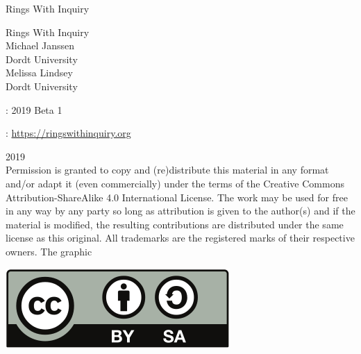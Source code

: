 \documentclass[oneside,10pt,]{book}
\numberwithin{equation}{section}
\begin{document}
\frontmatter
\thispagestyle{empty}
{\centering
\vspace*{0.28\textheight}
{\Huge Rings With Inquiry}\\}
\clearpage
\thispagestyle{empty}
\null%
\clearpage
\thispagestyle{empty}
{\centering
\vspace*{0.14\textheight}
{\Huge Rings With Inquiry}\\[3\baselineskip]
{\Large Michael Janssen}\\[0.5\baselineskip]
{\Large Dordt University}\\[3\baselineskip]
{\Large Melissa Lindsey}\\[0.5\baselineskip]
{\Large Dordt University}\\}
\clearpage
\thispagestyle{empty}
\hypertarget{g:colophon:idm269944732912}{}
: 2019 Beta 1\par\medskip
{}: \href{https:\slash{}\slash{}ringswithinquiry.org}{https:\slash{}\slash{}ringswithinquiry.org}\par\medskip
\noindent\textcopyright{}2019\textendash{}\quad{}\\[0.5\baselineskip]
Permission is granted to copy and (re)distribute this material in any format and\slash{}or adapt it (even commercially) under the terms of the Creative Commons Attribution-ShareAlike 4.0 International License.  The work may be used for free in any way by any party so long as attribution is given to the author(s) and if the material is modified, the resulting contributions are distributed under the same license as this original.  All trademarks\texttrademark{} are the registered\textregistered{} marks of their respective owners. The graphic \begin{sidebyside}{1}{0.375}{0.375}{0}%
\begin{sbspanel}{0.25}%
\includegraphics[width=\linewidth]{./images/CC-BY-SA-license.svg}
\end{sbspanel}%
\end{sidebyside}%
\end{document}
